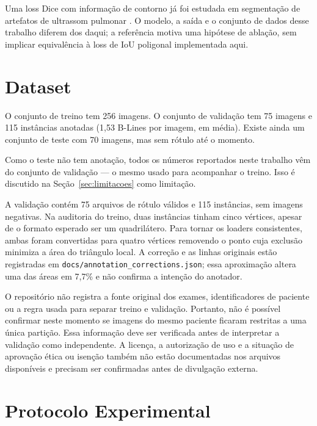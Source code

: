 \documentclass[11pt]{article}
\begin{document}
Uma loss Dice com informação de contorno já foi estudada em segmentação de
artefatos de ultrassom pulmonar \cite{abbasi2025}. O modelo, a saída e o conjunto
de dados desse trabalho diferem dos daqui; a referência motiva uma hipótese de
ablação, sem implicar equivalência à loss de IoU poligonal implementada aqui.

\section{Dataset}

O conjunto de treino tem 256 imagens. O conjunto de validação tem 75 imagens e 115
instâncias anotadas (1,53 B-Lines por imagem, em média). Existe ainda um conjunto de
teste com 70 imagens, mas sem rótulo até o momento.

Como o teste não tem anotação, todos os números reportados neste trabalho vêm do
conjunto de validação --- o mesmo usado para acompanhar o treino. Isso é discutido
na Seção~\ref{sec:limitacoes} como limitação.

A validação contém 75 arquivos de rótulo válidos e 115 instâncias, sem imagens
negativas. Na auditoria do treino, duas instâncias tinham cinco vértices, apesar de
o formato esperado ser um quadrilátero. Para tornar os loaders consistentes, ambas
foram convertidas para quatro vértices removendo o ponto cuja exclusão minimiza a
área do triângulo local. A correção e as linhas originais estão registradas em
\texttt{docs/annotation\_corrections.json}; essa aproximação altera uma das áreas
em 7,7\% e não confirma a intenção do anotador.

O repositório não registra a fonte original dos exames, identificadores de
paciente ou a regra usada para separar treino e validação. Portanto, não é possível
confirmar neste momento se imagens do mesmo paciente ficaram restritas a uma única
partição. Essa informação deve ser verificada antes de interpretar a validação como
independente. A licença, a autorização de uso e a situação de aprovação ética ou
isenção também não estão documentadas nos arquivos disponíveis e precisam ser
confirmadas antes de divulgação externa.

\section{Protocolo Experimental}
\end{document}
